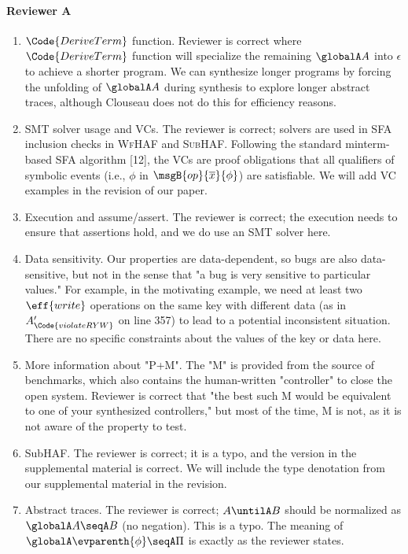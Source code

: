 \paragraph{Reviewer A}
\begin{enumerate}
    \item $\Code{DeriveTerm}$ function. Reviewer is correct where $\Code{DeriveTerm}$ function will specialize the remaining $\globalA A$ into $\epsilon$ to achieve a shorter program. We can synthesize longer programs by forcing the unfolding of $\globalA A$ during synthesis to explore longer abstract traces, although {\sf Clouseau} does not do this for efficiency reasons.
    \item SMT solver usage and VCs. The reviewer is correct; solvers are used in SFA inclusion checks in \textsc{WfHAF} and \textsc{SubHAF}. Following the standard minterm-based SFA algorithm [12], the VCs are proof obligations that all qualifiers of symbolic events (i.e., $\phi$ in $\msgB{op}{\overline{x}}{\phi}$) are satisfiable. We will add VC examples in the revision of our paper.
    \item Execution and assume/assert. The reviewer is correct; the execution needs to ensure that assertions hold, and we do use an SMT solver here.
    \item Data sensitivity. Our properties are data-dependent, so bugs are also data-sensitive, but not in the sense that "a bug is very sensitive to particular values." For example, in the motivating example, we need at least two $\eff{write}$ operations on the same key with different data (as in $A'_\Code{violateRYW}$ on line 357) to lead to a potential inconsistent situation. There are no specific constraints about the values of the key or data here.
    \item More information about "P+M". The "M" is provided from the source of benchmarks, which also contains the human-written "controller" to close the open system. Reviewer is correct that "the best such M would be equivalent to one of your synthesized controllers," but most of the time, M is not, as it is not aware of the property to test.
    \item SubHAF. The reviewer is correct; it is a typo, and the version in the supplemental material is correct. We will include the type denotation from our supplemental material in the revision.
    \item Abstract traces. The reviewer is correct; $A \untilA B$ should be normalized as $\globalA A \seqA B$ (no negation). This is a typo. The meaning of $\globalA \evparenth{\phi}\seqA\Pi$ is exactly as the reviewer states.
\end{enumerate}

